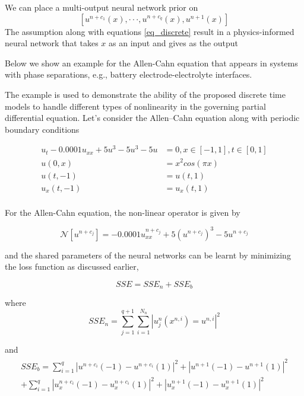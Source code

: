 \documentclass[book.tex]{subfiles}
\begin{document}
We can place a multi-output neural network prior on
\begin{equation}
\label{eq_discrete}
    [u^{n+c_1}(x),\cdot\cdot\cdot,u^{n+c_q}(x),u^{n+1}(x)]
\end{equation}
The assumption along with equations \ref{eq_discrete} result in a physics-informed neural network that takes $x$ as an input and gives as the output 
\begin{equation}
    [u^{n}_1(x),\cdot\cdot\cdot,u^{n}_q(x),u_{q+1}^{n+1}(x)]
\end{equation}

Below we show an example for the Allen-Cahn equation that appears in systems with phase separations, e.g., battery electrode-electrolyte interfaces. \\
\begin{example}
 The example is used to demonstrate the ability of the proposed discrete time models to handle different types of nonlinearity in the governing partial differential equation. Let's consider the Allen–Cahn equation along with periodic boundary conditions
 
 \begin{align}
     u_t-0.0001u_{xx}+5u^3-5u^3-5u &= 0, x\in[-1,1], t \in [0,1]\\
     u(0,x) &=x^2 cos(\pi x)\\
     u(t,-1) &=u(t,1)\\
     u_x(t,-1) &=u_x(t,1)\\
 \end{align}
 
 For the Allen-Cahn equation, the non-linear operator is given by
 
 \begin{equation}
     \mathcal{N}[u^{n+c_j}]=-0.0001u^{n+c_j}_{xx}+5(u^{n+c_j})^3-5u^{n+c_j}
 \end{equation}
 
 and the shared parameters of the neural networks can be learnt by minimizing the loss function as discussed earlier,
 
 \begin{equation}
     SSE=SSE_n+SSE_b
 \end{equation}
 
 where
 \begin{equation}
     SSE_n=\sum_{j=1}^{q+1}\sum_{i=1}^{N_n}|u^n_j(x^{n,i})=u^{n,i}|^2
 \end{equation}
 
 and
 \begin{align}
 \begin{split}
     SSE_b=\sum_{i=1}^q|u^{n+c_i}(-1)-u^{n+c_i}(1)|^2+|u^{n+1}(-1)-u^{n+1}(1)|^2\\
     +\sum_{i=1}^q|u_x^{n+c_i}(-1)-u_x^{n+c_i}(1)|^2+|u_x^{n+1}(-1)-u_x^{n+1}(1)|^2
 \end{split}
 \end{align}


\end{example}
\end{document}
